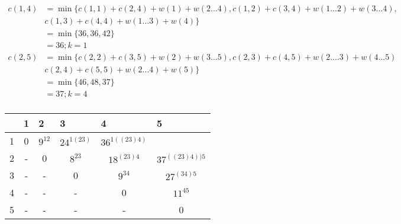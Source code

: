 \documentclass[12pt]{article}
\begin{document}
\begin{align*}
c(1,4) & = \min \{ c(1,1) + c(2,4) + w(1) + w(2...4), c(1,2) + c(3,4) + w(1...2) + w(3...4),\\
	& c(1,3) + c(4,4) + w(1...3) + w(4)\} \\
           & = \min\{36, 36, 42  \}\\
           & = 36; k =1\\
c(2,5) & = \min \{c(2,2) + c(3,5) + w(2) + w(3...5), c(2,3) + c(4,5) + w(2....3) + w(4...5) \\
	& c(2,4) + c(5,5) + w(2...4) + w(5)\} \\
          & = \min \{ 46,48, 37 \}\\
          & = 37; k=4 \\
\end{align*}

\begin{table}[h]
\centering
\begin{tabular}{|c|c|c|c|c|c|}
\hline
\multicolumn{1}{|l|}{} & \multicolumn{1}{|l|}{1} & \multicolumn{1}{l|}{2} & \multicolumn{1}{l|}{3} & \multicolumn{1}{l|}{4} & \multicolumn{1}{l|}{5} \\ \hline
1&0                       &       $9^{12}   $            &          $24^{1(23)}$               &    $36^{1((23)4)}$                   &                   \\ \hline
2&-                       & 0                     &    $8^{23} $                  &     $18^{(23)4} $                    &   $37^{((23)4))5}$                \\ \hline
3&-                       & -                     & 0                     &      $ 9^{34} $                  &    $27^{(34)5}$                     \\ \hline
4&-                       & -                     & -                     & 0                     &        $11^{45}$                  \\ \hline
5&-                       & -                     & -                     & -                     &    0                   \\ \hline
\end{tabular}
\end{table}
\end{document}
